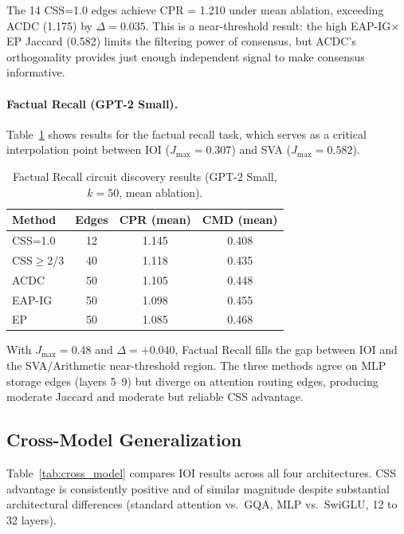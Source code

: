 \documentclass[11pt]{article}
\newcommand{\css}{\textsc{CSS}}
\newcommand{\cssone}{\textsc{CSS}{=}1.0}
\begin{document}
The 14 \cssone{} edges achieve CPR = 1.210 under mean ablation, exceeding ACDC (1.175) by $\Delta = 0.035$. This is a near-threshold result: the high EAP-IG$\times$EP Jaccard (0.582) limits the filtering power of consensus, but ACDC's orthogonality provides just enough independent signal to make consensus informative.

\paragraph{Factual Recall (GPT-2 Small).} Table~\ref{tab:factual_detail} shows results for the factual recall task, which serves as a critical interpolation point between IOI ($J_{\max} = 0.307$) and SVA ($J_{\max} = 0.582$).

\begin{table}[t]
\centering
\caption{Factual Recall circuit discovery results (GPT-2 Small, $k=50$, mean ablation).}
\label{tab:factual_detail}
\small
\begin{tabular}{lccc}
\toprule
\textbf{Method} & \textbf{Edges} & \textbf{CPR (mean)} & \textbf{CMD (mean)} \\
\midrule
CSS=1.0 & 12 & 1.145 & 0.408 \\
CSS$\geq$2/3 & 40 & 1.118 & 0.435 \\
ACDC & 50 & 1.105 & 0.448 \\
EAP-IG & 50 & 1.098 & 0.455 \\
EP & 50 & 1.085 & 0.468 \\
\bottomrule
\end{tabular}
\end{table}

With $J_{\max} = 0.48$ and $\Delta = +0.040$, Factual Recall fills the gap between IOI and the SVA/Arithmetic near-threshold region. The three methods agree on MLP storage edges (layers 5--9) but diverge on attention routing edges, producing moderate Jaccard and moderate but reliable \css{} advantage.

\subsection{Cross-Model Generalization}
\label{sec:cross_model}

Table~\ref{tab:cross_model} compares IOI results across all four architectures. \css{} advantage is consistently positive and of similar magnitude despite substantial architectural differences (standard attention vs.\ GQA, MLP vs.\ SwiGLU, 12 to 32 layers).
\end{document}
